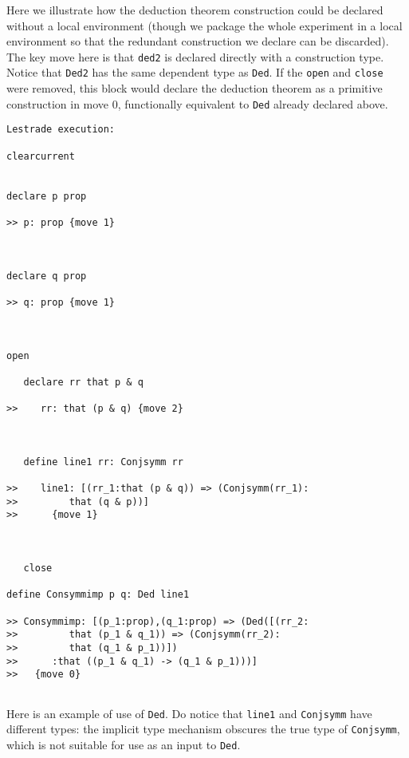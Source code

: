 \documentclass[12pt]{article}
\begin{document}
Here we illustrate how the deduction theorem construction could be declared without a local environment (though we package the whole experiment in a local environment so that the redundant  construction we declare can be discarded).  The key move here is that {\tt ded2} is declared directly with a construction type.   Notice that {\tt Ded2} has the same dependent type as {\tt Ded}.  If the {\tt open} and {\tt close} were removed, this block would declare the deduction theorem as a primitive construction in move 0, functionally equivalent to {\tt Ded} already declared above.

\begin{verbatim}Lestrade execution:

clearcurrent


declare p prop

>> p: prop {move 1}



declare q prop

>> q: prop {move 1}



open

   declare rr that p & q

>>    rr: that (p & q) {move 2}



   define line1 rr: Conjsymm rr

>>    line1: [(rr_1:that (p & q)) => (Conjsymm(rr_1):
>>         that (q & p))]
>>      {move 1}



   close

define Consymmimp p q: Ded line1

>> Consymmimp: [(p_1:prop),(q_1:prop) => (Ded([(rr_2:
>>         that (p_1 & q_1)) => (Conjsymm(rr_2):
>>         that (q_1 & p_1))])
>>      :that ((p_1 & q_1) -> (q_1 & p_1)))]
>>   {move 0}


\end{verbatim}

Here is an example of use of {\tt Ded}.  Do notice that {\tt line1} and {\tt Conjsymm} have different types:  the implicit type mechanism obscures the true type of {\tt Conjsymm}, which is not suitable for use as an input to {\tt Ded}.
\end{document}
